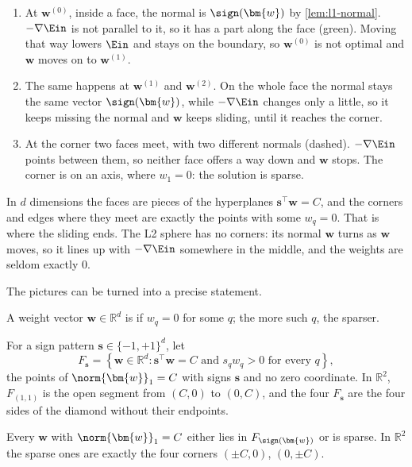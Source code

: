 \begin{enumerate}[(1)]
    \item At \(\bm{w}^{(0)}\), inside a face, the normal is \(\sign(\bm{w})\)
        by \autoref{lem:l1-normal}. \(-\nabla \Ein\) is not parallel to it, so
        it has a part along the face (green). Moving that way lowers \(\Ein\)
        and stays on the boundary, so \(\bm{w}^{(0)}\) is not optimal and
        \(\bm{w}\) moves on to \(\bm{w}^{(1)}\).
    \item The same happens at \(\bm{w}^{(1)}\) and \(\bm{w}^{(2)}\). On the
        whole face the normal stays the same vector \(\sign(\bm{w})\), while
        \(-\nabla \Ein\) changes only a little, so it keeps missing the normal
        and \(\bm{w}\) keeps sliding, until it reaches the corner.
    \item At the corner two faces meet, with two different normals (dashed).
        \(-\nabla \Ein\) points between them, so neither face offers a way down
        and \(\bm{w}\) stops. The corner is on an axis, where \(w_1 = 0\): the
        solution is sparse.
\end{enumerate}
In \(d\) dimensions the faces are pieces of the hyperplanes \(\bm{s}^\top
\bm{w} = C\), and the corners and edges where they meet are exactly the points
with some \(w_q = 0\). That is where the sliding ends. The L2 sphere has no
corners: its normal \(\bm{w}\) turns as \(\bm{w}\) moves, so it lines up with
\(-\nabla \Ein\) somewhere in the middle, and the weights are seldom exactly
\(0\).

The pictures can be turned into a precise statement.

\begin{definition}\label{def:sparse}
    A weight vector \(\bm{w} \in \mathbb{R}^d\) is  if \(w_q = 0\)
    for some \(q\); the more such \(q\), the sparser.
\end{definition}

For a sign pattern \(\bm{s} \in \{-1, +1\}^d\), let
\[
    F_{\bm{s}} = \left\{ \bm{w} \in \mathbb{R}^d : \bm{s}^\top \bm{w} = C
    \text{ and } s_q w_q > 0 \text{ for every } q \right\} ,
\]
the points of \(\norm{\bm{w}}_1 = C\) with signs \(\bm{s}\) and no zero
coordinate. In \(\mathbb{R}^2\), \(F_{(1,1)}\) is the open segment from \((C,
0)\) to \((0, C)\), and the four \(F_{\bm{s}}\) are the four sides of the
diamond without their endpoints.

\begin{lemma}\label{lem:l1-zeros}
    Every \(\bm{w}\) with \(\norm{\bm{w}}_1 = C\) either lies in
    \(F_{\sign(\bm{w})}\) or is sparse. In \(\mathbb{R}^2\) the sparse ones are
    exactly the four corners \((\pm C, 0)\), \((0, \pm C)\).
\end{lemma}


